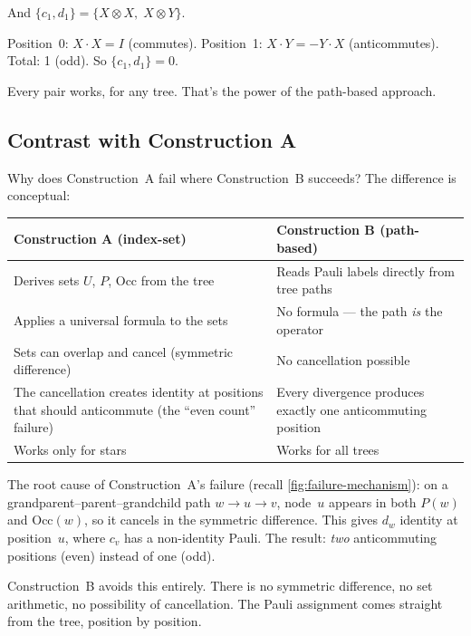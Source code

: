 \documentclass[11pt,a4paper]{article}
\theoremstyle{definition}
\begin{document}
And $\{c_1, d_1\} = \{X \otimes X,\; X \otimes Y\}$.

Position~0: $X \cdot X = I$ (commutes).
Position~1: $X \cdot Y = -Y \cdot X$ (anticommutes).
Total: 1 (odd).  So $\{c_1, d_1\} = 0$. \checkmark

Every pair works, for any tree.  That's the power of the path-based
approach.

\subsection{Contrast with Construction A}

Why does Construction~A fail where Construction~B succeeds?
The difference is conceptual:

\begin{center}
\begin{tabular}{@{}p{5.5cm}p{5.5cm}@{}}
\toprule
\textbf{Construction A (index-set)} & \textbf{Construction B (path-based)} \\
\midrule
Derives sets $U$, $P$, $\mathrm{Occ}$ from the tree &
Reads Pauli labels directly from tree paths \\
\addlinespace
Applies a universal formula to the sets &
No formula --- the path \emph{is} the operator \\
\addlinespace
Sets can overlap and cancel (symmetric difference) &
No cancellation possible \\
\addlinespace
The cancellation creates identity at positions that should
anticommute (the ``even count'' failure) &
Every divergence produces exactly one anticommuting position \\
\addlinespace
Works only for stars &
Works for all trees \\
\bottomrule
\end{tabular}
\end{center}

The root cause of Construction~A's failure (recall
\cref{fig:failure-mechanism}): on a grandparent--parent--grandchild
path $w \to u \to v$, node~$u$ appears in both $P(w)$ and
$\mathrm{Occ}(w)$, so it cancels in the symmetric difference.  This
gives $d_w$ identity at position~$u$, where $c_v$ has a non-identity
Pauli.  The result: \emph{two} anticommuting positions (even) instead
of one (odd).

Construction~B avoids this entirely.  There is no symmetric difference,
no set arithmetic, no possibility of cancellation.  The Pauli
assignment comes straight from the tree, position by position.
\end{document}
